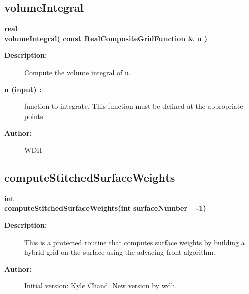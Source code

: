 \subsection{volumeIntegral}
 
\begin{flushleft} \textbf{%
real  \\ 
\settowidth{\IntegrateIncludeArgIndent}{volumeIntegral(}%
volumeIntegral( const RealCompositeGridFunction \& u )
}\end{flushleft}
\begin{description}
\item[{\bf Description:}] 
    Compute the volume integral of u. 
\item[{\bf u (input) :}]  function to integrate. This function must be defined at the appropriate points.
\item[{\bf Author:}]  WDH
\end{description}
\subsection{computeStitchedSurfaceWeights}
 
\begin{flushleft} \textbf{%
int  \\ 
\settowidth{\IntegrateIncludeArgIndent}{computeStitchedSurfaceWeights(}%
computeStitchedSurfaceWeights(int surfaceNumber  =-1)
}\end{flushleft}
\begin{description}
\item[{\bf Description:}] 
    This is a protected routine that computes surface weights by building a hybrid grid
  on the surface using the advacing front algorithm.
 
\item[{\bf Author:}]  
   Initial version: Kyle Chand. 
   New version by wdh. 
\end{description}

